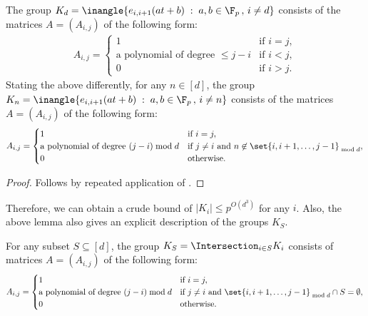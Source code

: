 \documentclass{toc}
\begin{document}
\begin{lemma}
  The group $K_d = \inangle{e_{i,i+1}(at + b)\;:\; a,b\in \F_p\,,\, i\neq d}$ 
  consists of
 the %
%
matrices $A = (A_{i,j})$ of the following form:
  \begin{align*}
    A_{i,j} = \begin{cases}
      1 & \text{if }i = j,\\
%
      \text{a polynomial of degree $\leq j - i$} & \text{if }i < j,\\  %
      0 & \text{if }i > j.
    \end{cases}
  \end{align*}
  \noindent 
%
%
%
  Stating the above differently, %
  for any $n \in [d]$, the group 
 $K_n = \inangle{e_{i,i+1}(at + b)\;:\; a,b\in \F_p\,,\, i\neq n}$
%
%
%
consists of
the   %
matrices $A = (A_{i,j})$ of the following form:
  \begin{align*}
    A_{i,j} = \begin{cases}
      1 & \text{if }i = j,\\
      \text{a polynomial of degree $(j - i)\bmod{d}$} & \text{if }j\neq i \text{ and }n\not\in\set{i,i+1,\ldots,j-1}_{\bmod{d}},\\
      0 & \text{otherwise}.
    \end{cases}
  \end{align*}
\end{lemma}
%
%
\begin{proof}
%
Follows by repeated application  %
of . 
\end{proof}

\noindent
Therefore, we can obtain a crude bound of $|K_i| \leq p^{O(d^3)}$ for any $i$. Also, the above lemma also gives an explicit description of the groups $K_S$. 

\begin{corollary}\label{cor:exp-desc-K_S}
For any subset $S \subseteq [d]$, the group $K_S = \Intersection_{i\in S} K_i$ consists of matrices $A = (A_{i,j})$ of the following form:
\begin{align*}
  A_{i,j} = \begin{cases}
    1 & \text{if }i = j,\\
    \text{a polynomial of degree $(j - i)\bmod{d}$} & \text{if }j\neq i \text{ and }\set{i,i+1,\ldots,j-1}_{\bmod{d}} \cap S = \emptyset,\\
    0 & \text{otherwise}.
  \end{cases}
\end{align*}
\end{corollary}
\end{document}
